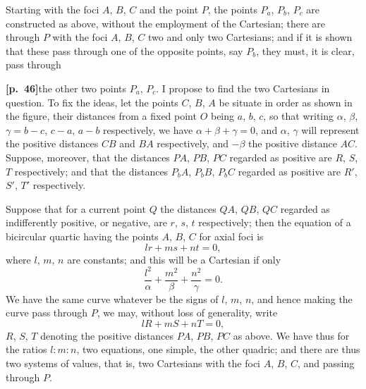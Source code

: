 \documentclass[11pt,a4paper]{article}
\begin{document}
Starting with the foci $A$, $B$, $C$ and the point $P$, the points $P_{a}$, $P_{b}$, $P_{c}$ are constructed as above, without the employment of the Cartesian; there are through $P$ with the foci $A$, $B$, $C$ two and only two Cartesians; and if it is shown that these pass through one of the opposite points, say $P_{b}$, they must, it is clear, pass through

\bigskip

\noindent\textbf{[p.~46]}\quad the other two points $P_{a}$, $P_{c}$. I propose to find the two Cartesians in question. To fix the ideas, let the points $C$, $B$, $A$ be situate in order as shown in the figure, their distances from a fixed point $O$ being $a$, $b$, $c$, so that writing $\alpha$, $\beta$, $\gamma = b-c$, $c-a$, $a-b$ respectively, we have $\alpha + \beta + \gamma = 0$, and $\alpha$, $\gamma$ will represent the positive distances $CB$ and $BA$ respectively, and $-\beta$ the positive distance $AC$. Suppose, moreover, that the distances $PA$, $PB$, $PC$ regarded as positive are $R$, $S$, $T$ respectively; and that the distances $P_{b}A$, $P_{b}B$, $P_{b}C$ regarded as positive are $R'$, $S'$, $T'$ respectively.

\begin{center}
\end{center}

Suppose that for a current point $Q$ the distances $QA$, $QB$, $QC$ regarded as indifferently positive, or negative, are $r$, $s$, $t$ respectively; then the equation of a bicircular quartic having the points $A$, $B$, $C$ for axial foci is
\[
lr + ms + nt = 0,
\]
where $l$, $m$, $n$ are constants; and this will be a Cartesian if only
\[
\frac{l^{2}}{\alpha} + \frac{m^{2}}{\beta} + \frac{n^{2}}{\gamma} = 0.
\]
We have the same curve whatever be the signs of $l$, $m$, $n$, and hence making the curve pass through $P$, we may, without loss of generality, write
\[
lR + mS + nT = 0,
\]
$R$, $S$, $T$ denoting the positive distances $PA$, $PB$, $PC$ as above. We have thus for the ratios $l:m:n$, two equations, one simple, the other quadric; and there are thus two systems of values, that is, two Cartesians with the foci $A$, $B$, $C$, and passing through $P$.
\end{document}
